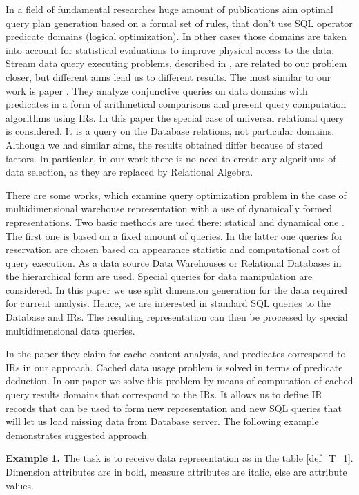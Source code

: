 \documentclass[10pt,a4paper]{article}
\begin{document}
In a field of fundamental researches huge amount of publications aim optimal
query plan generation based on a formal set of rules, that don't use SQL operator
predicate domains (logical optimization). In other cases those domains are
taken into account for statistical evaluations to improve physical access to the
data. Stream data query executing problems, described in
\cite{Olston03, Denny05}, are related to our problem closer, but different aims
lead us to different results. The most similar to our work is paper
\cite{Afrati06}. They analyze conjunctive queries on data domains with
predicates in a form of arithmetical comparisons and present query computation
algorithms using IRs. In this paper the special case of universal relational
query is considered. It is a query on the Database relations, not particular
domains. Although we had similar aims, the results obtained differ because of
stated factors. In particular, in our work there is no need to create any
algorithms of data selection, as they are replaced by Relational Algebra.

There are some works, which examine query optimization problem in the case of
multidimensional warehouse representation with a use of dynamically formed
representations. Two basic methods are used there: statical \cite{baralis,
gupta, gupta-mumick} and dynamical one \cite{scheuermann, shim, kalnis, chang}.
The first one is based on a fixed amount of queries. In the latter one queries
for reservation are chosen based on appearance statistic and computational cost
of query execution. As a data source Data Warehouses or Relational Databases in
the hierarchical form are used. Special queries for data manipulation are
considered. In this paper we use split dimension generation for the data
required for current analysis. Hence, we are interested in standard SQL queries
to the Database and IRs. The resulting representation can then be processed by
special multidimensional data queries.

In the \cite{Keller96} paper they claim for cache content analysis, and
predicates correspond to IRs in our approach. Cached data usage problem is solved
in terms of predicate deduction. In our paper we solve this problem by means of
computation of cached query results domains that correspond to the IRs. It allows
us to define IR records that can be used to form new representation and new SQL
queries that will let us load missing data from Database server. The following
example demonstrates suggested approach.


{\bf Example 1.} The task is to receive data representation as in the table
\ref{def_T_1}. Dimension attributes are in bold, measure attributes are italic,
else are attribute values.
\end{document}
